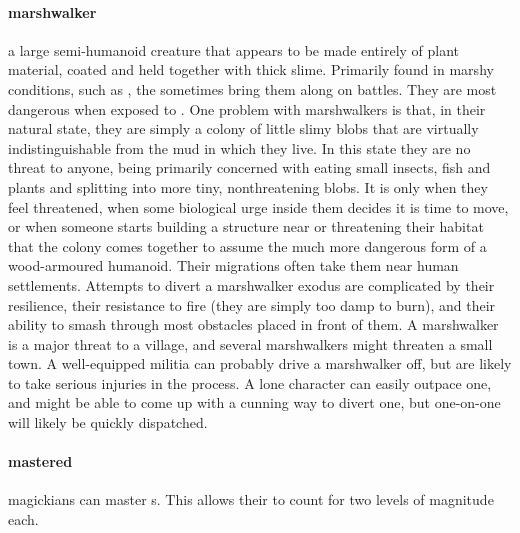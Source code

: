 \paragraph{marshwalker} a large semi-humanoid creature that appears to be made entirely of plant material, coated and held together with thick slime. Primarily found in marshy conditions, such as , the  sometimes bring them along on battles. They are most dangerous when exposed to . One problem with marshwalkers is that, in their natural state, they are simply a colony of little slimy blobs that are virtually indistinguishable from the mud in which they live. In this state they are no threat to anyone, being primarily concerned with eating small insects, fish and plants and splitting into more tiny, nonthreatening blobs. \localpar It is only when they feel threatened, when some biological urge inside them decides it is time to move, or when someone starts building a structure near or threatening their habitat that the colony comes together to assume the much more dangerous form of a wood-armoured humanoid. Their migrations often take them near human settlements. Attempts to divert a marshwalker exodus are complicated by their resilience, their resistance to fire (they are simply too damp to burn), and their ability to smash through most obstacles placed in front of them. \localpar A marshwalker is a major threat to a village, and several marshwalkers might threaten a small town. A well-equipped militia can probably drive a marshwalker off, but are likely to take serious injuries in the process. A lone character can easily outpace one, and might be able to come up with a cunning way to divert one, but one-on-one will likely be quickly dispatched. 
\paragraph{mastered} magickians can master s. This allows their  to count for two levels of magnitude each.
